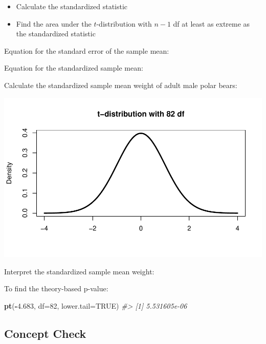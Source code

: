 \documentclass[
]{report}
\newenvironment{Shaded}{\begin{snugshade}}{\end{snugshade}}
\newcommand{\AttributeTok}[1]{\textcolor[rgb]{0.13,0.29,0.53}{#1}}
\newcommand{\CommentTok}[1]{\textcolor[rgb]{0.56,0.35,0.01}{\textit{#1}}}
\newcommand{\ConstantTok}[1]{\textcolor[rgb]{0.56,0.35,0.01}{#1}}
\newcommand{\DecValTok}[1]{\textcolor[rgb]{0.00,0.00,0.81}{#1}}
\newcommand{\FloatTok}[1]{\textcolor[rgb]{0.00,0.00,0.81}{#1}}
\newcommand{\FunctionTok}[1]{\textcolor[rgb]{0.13,0.29,0.53}{\textbf{#1}}}
\newcommand{\NormalTok}[1]{#1}
\newcommand{\SpecialCharTok}[1]{\textcolor[rgb]{0.81,0.36,0.00}{\textbf{#1}}}
\begin{document}
\begin{itemize}
\item
  Calculate the standardized statistic
\item
  Find the area under the \(t\)-distribution with \(n - 1\) df at least as extreme as the standardized statistic
\end{itemize}

Equation for the standard error of the sample mean:

\vspace{0.5in}

Equation for the standardized sample mean:

\vspace{0.5in}

Calculate the standardized sample mean weight of adult male polar bears:

\vspace{0.4in}

\begin{center}\includegraphics[width=0.7\linewidth]{06-VN06-EDAonemeanSim_files/figure-latex/pvaluepb-1} \end{center}

Interpret the standardized sample mean weight:

\vspace{0.8in}

To find the theory-based p-value:

\begin{Shaded}
\begin{Highlighting}[]
\FunctionTok{pt}\NormalTok{(}\SpecialCharTok{{-}}\FloatTok{4.683}\NormalTok{, }\AttributeTok{df=}\DecValTok{82}\NormalTok{, }\AttributeTok{lower.tail=}\ConstantTok{TRUE}\NormalTok{)}
\CommentTok{\#\textgreater{} [1] 5.531605e{-}06}
\end{Highlighting}
\end{Shaded}

\subsection{Concept Check}\label{concept-check}
\end{document}

